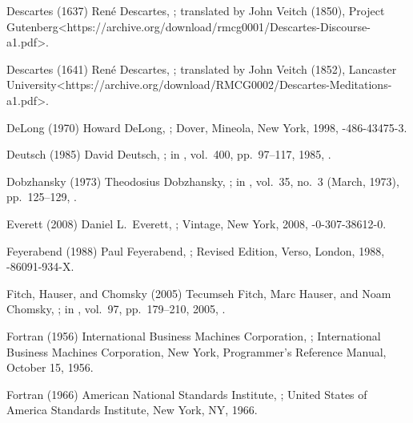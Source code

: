 \biblabel Descartes (1637)
René Descartes,
;
translated by John Veitch (1850),
\URL Project Gutenberg<https://archive.org/download/rmcg0001/Descartes-Discourse-a1.pdf>.

\biblabel Descartes (1641)
René Descartes,
;
translated by John Veitch (1852),
\URL Lancaster University<https://archive.org/download/RMCG0002/Descartes-Meditations-a1.pdf>.

\biblabel DeLong (1970)
Howard DeLong,
;
Dover, Mineola, New York, 1998,
-486-43475-3.

\biblabel Deutsch (1985)
David Deutsch,
;
in ,
 vol.\ 400, pp.\ 97--117, 1985,
.

\biblabel Dobzhansky (1973)
Theodosius Dobzhansky,
;
in ,
 vol.\ 35, no.\ 3 (March, 1973), pp.\ 125--129,
.

\biblabel Everett (2008)
Daniel L.\ Everett,
;
Vintage, New York, 2008,
-0-307-38612-0.

\biblabel Feyerabend (1988)
Paul Feyerabend,
;
Revised Edition, Verso, London, 1988,
-86091-934-X.

\biblabel  Fitch, Hauser, and Chomsky (2005)
Tecumseh Fitch, Marc Hauser, and Noam Chomsky,
;
in ,
vol.\ 97, pp.\ 179--210, 2005,
.

\biblabel Fortran (1956)
International Business Machines Corporation,
;
International Business Machines Corporation, New York,
Programmer's Reference Manual, October 15, 1956.

\biblabel Fortran (1966)
American National Standards Institute,
;
United States of America Standards Institute, New York, NY, 1966.

